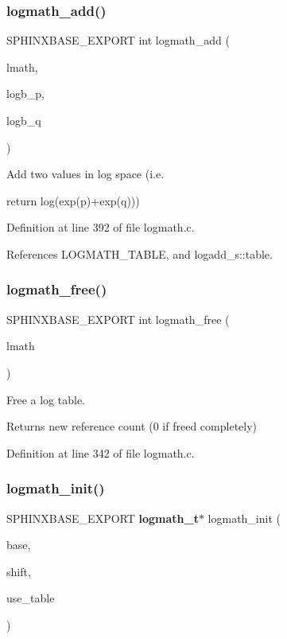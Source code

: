 \subsubsection{logmath\+\_\+add()}
{\footnotesize\ttfamily S\+P\+H\+I\+N\+X\+B\+A\+S\+E\+\_\+\+E\+X\+P\+O\+RT int logmath\+\_\+add (\begin{DoxyParamCaption}\item[{\textbf{ logmath\+\_\+t} $\ast$}]{lmath,  }\item[{int}]{logb\+\_\+p,  }\item[{int}]{logb\+\_\+q }\end{DoxyParamCaption})}



Add two values in log space (i.\+e. 

return log(exp(p)+exp(q))) 

Definition at line 392 of file logmath.\+c.



References L\+O\+G\+M\+A\+T\+H\+\_\+\+T\+A\+B\+LE, and logadd\+\_\+s\+::table.

\mbox{\label{logmath_8h_a97865ef8bc1e8e2525a2329e0627ecfb}} 
\subsubsection{logmath\+\_\+free()}
{\footnotesize\ttfamily S\+P\+H\+I\+N\+X\+B\+A\+S\+E\+\_\+\+E\+X\+P\+O\+RT int logmath\+\_\+free (\begin{DoxyParamCaption}\item[{\textbf{ logmath\+\_\+t} $\ast$}]{lmath }\end{DoxyParamCaption})}



Free a log table. 

\begin{DoxyReturn}{Returns}
new reference count (0 if freed completely) 
\end{DoxyReturn}


Definition at line 342 of file logmath.\+c.

\mbox{\label{logmath_8h_a5835860c5f6a703c80c0214f816f0b11}} 
\subsubsection{logmath\+\_\+init()}
{\footnotesize\ttfamily S\+P\+H\+I\+N\+X\+B\+A\+S\+E\+\_\+\+E\+X\+P\+O\+RT \textbf{ logmath\+\_\+t}$\ast$ logmath\+\_\+init (\begin{DoxyParamCaption}\item[{float64}]{base,  }\item[{int}]{shift,  }\item[{int}]{use\+\_\+table }\end{DoxyParamCaption})}



